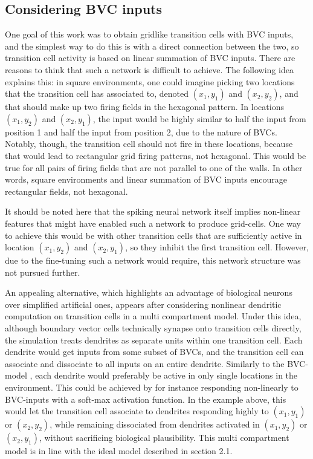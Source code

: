\documentclass{article}
\begin{document}
    \subsection{Considering BVC inputs}

    One goal of this work was to obtain gridlike transition cells with BVC inputs, and the simplest way to do this is with a direct connection between the two, so transition cell activity is based on linear summation of BVC inputs. There are reasons to think that such a network is difficult to achieve. The following idea explains this: in square environments, one could imagine picking two locations that the transition cell has associated to, denoted \((x_1, y_1)\) and \((x_2, y_2)\), and that should make up two firing fields in the hexagonal pattern. In locations \((x_1, y_2)\) and \((x_2, y_1)\), the input would be highly similar to half the input from position 1 and half the input from position 2, due to the nature of BVCs. Notably, though, the transition cell should not fire in these locations, because that would lead to rectangular grid firing patterns, not hexagonal. This would be true for all pairs of firing fields that are not parallel to one of the walls. In other words, square environments and linear summation of BVC inputs encourage rectangular fields, not hexagonal.
    
    It should be noted here that the spiking neural network itself implies non-linear features that might have enabled such a network to produce grid-cells. One way to achieve this would be with other transition cells that are sufficiently active in location \((x_1, y_2)\) and \((x_2, y_1)\), so they inhibit the first transition cell. However, due to the fine-tuning such a network would require, this network structure was not pursued further.

    An appealing alternative, which highlights an advantage of biological neurons over simplified artificial ones, appears after considering nonlinear dendritic computation on transition cells in a multi compartment model. Under this idea, although boundary vector cells technically synapse onto transition cells directly, the simulation treats dendrites as separate units within one transition cell. Each dendrite would get inputs from some subset of BVCs, and the transition cell can associate and dissociate to all inputs on an entire dendrite. Similarly to the BVC-model \parencite{Barry2006}, each dendrite would preferably be active in only single locations in the environment. This could be achieved by for instance responding non-linearly to BVC-inputs with a soft-max activation function. In the example above, this would let the transition cell associate to dendrites responding highly to \((x_1, y_1)\) or \((x_2, y_2)\), while remaining dissociated from dendrites activated in \((x_1, y_2)\) or \((x_2, y_1)\), without sacrificing biological plausibility. This multi compartment model is in line with the ideal model described in section 2.1.
\end{document}
